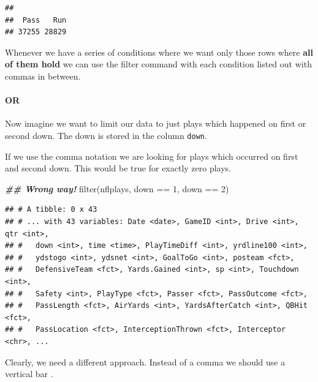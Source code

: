 \documentclass[
]{book}
\newenvironment{Shaded}{\begin{snugshade}}{\end{snugshade}}
\newcommand{\DecValTok}[1]{\textcolor[rgb]{0.00,0.00,0.81}{#1}}
\newcommand{\DocumentationTok}[1]{\textcolor[rgb]{0.56,0.35,0.01}{\textbf{\textit{#1}}}}
\newcommand{\FunctionTok}[1]{\textcolor[rgb]{0.00,0.00,0.00}{#1}}
\newcommand{\NormalTok}[1]{#1}
\newcommand{\OtherTok}[1]{\textcolor[rgb]{0.56,0.35,0.01}{#1}}
\newcommand{\SpecialCharTok}[1]{\textcolor[rgb]{0.00,0.00,0.00}{#1}}
\theoremstyle{definition}
\theoremstyle{definition}
\theoremstyle{definition}
\theoremstyle{definition}
\theoremstyle{remark}
\begin{document}
\begin{verbatim}
## 
##  Pass   Run 
## 37255 28829
\end{verbatim}

Whenever we have a series of conditions where we want only those rows where \textbf{all of them hold} we can use the filter command with each condition listed out with commas in between.

\hypertarget{or}{%
\paragraph{OR}\label{or}}

Now imagine we want to limit our data to just plays which happened on first or second down. The down is stored in the column \texttt{down}.

If we use the comma notation we are looking for plays which occurred on first and second down. This would be true for exactly zero plays.

\begin{Shaded}
\begin{Highlighting}[]
\DocumentationTok{\#\# Wrong way!}
\FunctionTok{filter}\NormalTok{(nflplays, down }\SpecialCharTok{==} \DecValTok{1}\NormalTok{, down }\SpecialCharTok{==} \DecValTok{2}\NormalTok{)}
\end{Highlighting}
\end{Shaded}

\begin{verbatim}
## # A tibble: 0 x 43
## # ... with 43 variables: Date <date>, GameID <int>, Drive <int>, qtr <int>,
## #   down <int>, time <time>, PlayTimeDiff <int>, yrdline100 <int>,
## #   ydstogo <int>, ydsnet <int>, GoalToGo <int>, posteam <fct>,
## #   DefensiveTeam <fct>, Yards.Gained <int>, sp <int>, Touchdown <int>,
## #   Safety <int>, PlayType <fct>, Passer <fct>, PassOutcome <fct>,
## #   PassLength <fct>, AirYards <int>, YardsAfterCatch <int>, QBHit <fct>,
## #   PassLocation <fct>, InterceptionThrown <fct>, Interceptor <chr>, ...
\end{verbatim}

Clearly, we need a different approach. Instead of a comma we should use a vertical bar \texttt{\textbar{}}.

\begin{Shaded}
\end{Shaded}
\end{document}
